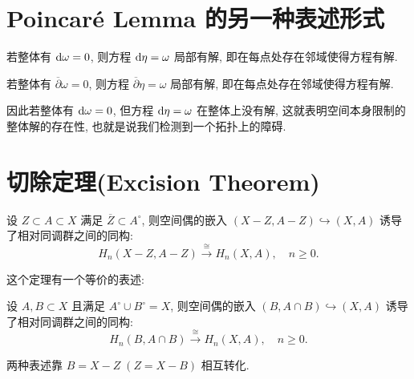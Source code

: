     \section[Poincar\'e Lemma]{Poincar\'e Lemma 的另一种表述形式}
        \begin{lemma}
            若整体有 ${\rm d}\omega = 0$, 则方程 ${\rm d}\eta=\omega$ 局部有解, 即在每点处存在邻域使得方程有解.
        \end{lemma}
        \begin{lemma}
            若整体有 $\overline{\partial}\omega = 0$, 则方程 $\overline{\partial}\eta=\omega$ 局部有解, 即在每点处存在邻域使得方程有解.
        \end{lemma}
        \begin{remark}
            因此若整体有 ${\rm d}\omega = 0$, 但方程 ${\rm d}\eta=\omega$ 在整体上没有解, 这就表明空间本身限制的整体解的存在性, 也就是说我们检测到一个拓扑上的障碍.
        \end{remark}

    \section[Excision Theorem in Signular Homology]{切除定理(Excision Theorem)}
        \begin{theorem}[切除定理表述1]\label{thm:excision-1}
            设 $Z\subset A\subset X$ 满足 $\overline{Z}\subset A^{\circ}$, 则空间偶的嵌入 $(X-Z,A-Z)\hookrightarrow(X,A)$ 诱导了相对同调群之间的同构:
            \begin{equation*}
                H_n(X-Z,A-Z)\overset{\cong}{\longrightarrow} H_n(X,A),\quad n\geq0.
            \end{equation*}
        \end{theorem}
        这个定理有一个等价的表述:
        \begin{theorem}[切除定理表述2]\label{thm:excision-2}
            设 $A,B\subset X$ 且满足 $A^{\circ}\cup B^{\circ}=X$, 则空间偶的嵌入 $(B,A\cap B)\hookrightarrow(X,A)$ 诱导了相对同调群之间的同构:
            \begin{equation*}
                H_n(B,A\cap B)\overset{\cong}{\longrightarrow} H_n(X,A),\quad n\geq0.
            \end{equation*}
        \end{theorem}
        \begin{remark}
            两种表述靠 $B=X-Z\;(Z=X-B)$ 相互转化.
        \end{remark}

